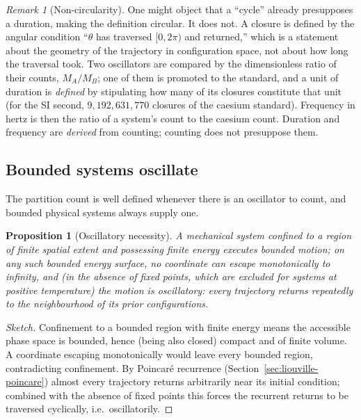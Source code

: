 \documentclass[11pt,a4paper]{article}
\theoremstyle{thmstyle}
\newtheorem{proposition}[theorem]{Proposition}
\theoremstyle{definition}
\theoremstyle{remark}
\newtheorem{remark}[theorem]{Remark}
\newcommand{\Count}{M}
\begin{document}
\begin{remark}[Non-circularity]
\label{rem:noncircular}
One might object that a ``cycle'' already presupposes a duration, making
the definition circular. It does not. A closure is defined by the
angular condition ``$\theta$ has traversed $[0,2\pi)$ and returned,''
which is a statement about the geometry of the trajectory in
configuration space, not about how long the traversal took. Two
oscillators are compared by the dimensionless ratio of their counts,
$\Count_{A}/\Count_{B}$; one of them is promoted to the standard, and a
unit of duration is \emph{defined} by stipulating how many of its
closures constitute that unit (for the SI second, $9{,}192{,}631{,}770$
closures of the caesium standard). Frequency in hertz is then the ratio
of a system's count to the caesium count. Duration and frequency are
\emph{derived} from counting; counting does not presuppose them.
\end{remark}

\subsection{Bounded systems oscillate}
\label{sec:bounded-osc}

The partition count is well defined whenever there is an oscillator to
count, and bounded physical systems always supply one.

\begin{proposition}[Oscillatory necessity]
\label{prop:osc-necessity}
A mechanical system confined to a region of finite spatial extent and
possessing finite energy executes bounded motion; on any such bounded
energy surface, no coordinate can escape monotonically to infinity, and
(in the absence of fixed points, which are excluded for systems at
positive temperature) the motion is oscillatory: every trajectory
returns repeatedly to the neighbourhood of its prior configurations.
\end{proposition}

\begin{proof}[Sketch]
Confinement to a bounded region with finite energy means the accessible
phase space is bounded, hence (being also closed) compact and of finite
volume. A coordinate escaping monotonically would leave every bounded
region, contradicting confinement. By Poincar\'e recurrence
(Section~\ref{sec:liouville-poincare}) almost every trajectory returns
arbitrarily near its initial condition; combined with the absence of
fixed points this forces the recurrent returns to be traversed
cyclically, i.e.\ oscillatorily.
\end{proof}
\end{document}
